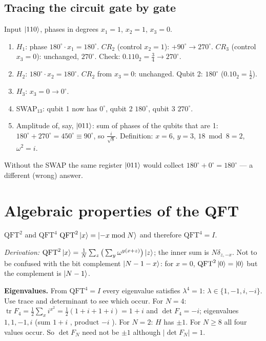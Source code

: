 \documentclass[11pt,a4paper,openany]{book}
\newcounter{wex}[chapter]
\newenvironment{steps}{\begin{enumerate}[label=\textbf{Step \arabic*.}, leftmargin=4.2em, itemsep=2pt]}{\end{enumerate}}
\newcommand{\QFT}{\mathrm{QFT}}
\begin{document}
\subsection{Tracing the circuit gate by gate}
\begin{wexample}{Input $\ket{110}$, phases in degrees}
$x_1 = 1$, $x_2 = 1$, $x_3 = 0$.
\begin{steps}
\item $H_1$: phase $180^\circ\cdot x_1 = 180^\circ$. $CR_2$ (control $x_2 = 1$): $+90^\circ \to 270^\circ$. $CR_3$ (control $x_3 = 0$): unchanged, $270^\circ$.
      Check: $0.110_2 = \frac34 \to 270^\circ$. \checkmark
\item $H_2$: $180^\circ\cdot x_2 = 180^\circ$. $CR_2$ from $x_3 = 0$: unchanged. Qubit 2: $180^\circ$ ($0.10_2 = \frac12$).
\item $H_3$: $x_3 = 0 \to 0^\circ$.
\item SWAP$_{13}$: qubit 1 now has $0^\circ$, qubit 2 $180^\circ$, qubit 3 $270^\circ$.
\item Amplitude of, say, $\ket{011}$: sum of phases of the qubits that are 1: $180^\circ + 270^\circ = 450^\circ \equiv 90^\circ$, so $\frac{i}{\sqrt8}$.
      Definition: $x = 6$, $y = 3$, $18 \bmod 8 = 2$, $\omega^2 = i$. \checkmark
\end{steps}
Without the SWAP the same register $\ket{011}$ would collect $180^\circ + 0^\circ = 180^\circ$ --- a different (wrong) answer.
\end{wexample}

\section{Algebraic properties of the QFT}
\begin{keyres}{$\QFT^2$ and $\QFT^4$}
$\QFT^2\ket x = \ket{-x \bmod N}$ and therefore $\QFT^4 = I$.
\end{keyres}
\emph{Derivation:} $\QFT^2\ket x = \frac1N\sum_z\big(\sum_y\omega^{y(x+z)}\big)\ket z$; the inner sum is $N\delta_{z,-x}$. Not to be confused with the
bit complement $\ket{N-1-x}$: for $x = 0$, $\QFT^2\ket0 = \ket0$ but the complement is $\ket{N-1}$.

\textbf{Eigenvalues.} From $\QFT^4 = I$ every eigenvalue satisfies $\lambda^4 = 1$: $\lambda \in \{1, -1, i, -i\}$. Use trace and
determinant to see which occur. For $N = 4$: $\operatorname{tr}F_4 = \frac12\sum_x i^{x^2} = \frac12(1 + i + 1 + i) = 1 + i$ and
$\det F_4 = -i$; eigenvalues $1, 1, -1, i$ (sum $1 + i$ \checkmark, product $-i$ \checkmark). For $N = 2$: $H$ has $\pm1$.
For $N \ge 8$ all four values occur. So $\det F_N$ need not be $\pm1$ although $|\det F_N| = 1$.
\end{document}
